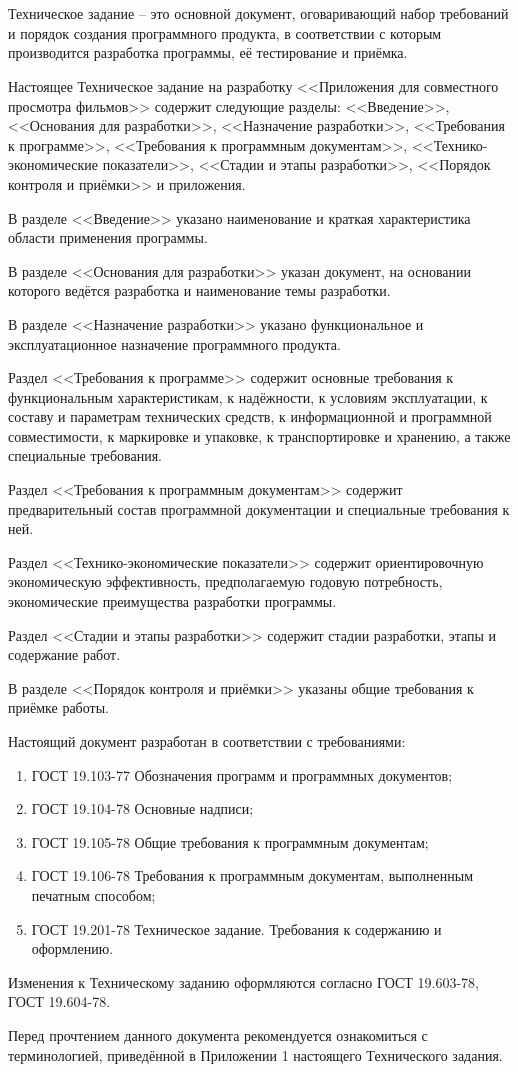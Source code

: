 \section*{}

Техническое задание -- это основной документ, оговаривающий набор требований и порядок создания программного продукта,
в соответствии с которым производится разработка программы, её тестирование и приёмка.

Настоящее Техническое задание на разработку <<Приложения для совместного просмотра фильмов>> содержит следующие разделы:
<<Введение>>, <<Основания для разработки>>, <<Назначение разработки>>, <<Требования к программе>>, <<Требования к программным документам>>,
<<Технико-экономические показатели>>, <<Стадии и этапы разработки>>, <<Порядок контроля и приёмки>> и приложения.

В разделе <<Введение>> указано наименование и краткая характеристика области применения программы.

В разделе <<Основания для разработки>> указан документ, на основании которого ведётся разработка и наименование темы разработки.

В разделе <<Назначение разработки>> указано функциональное и эксплуатационное назначение программного продукта.

Раздел <<Требования к программе>> содержит основные требования к функциональным характеристикам, к надёжности, к условиям
эксплуатации, к составу и параметрам технических средств, к информационной и программной совместимости, к маркировке и
упаковке, к транспортировке и хранению, а также специальные требования.

Раздел <<Требования к программным документам>> содержит предварительный состав программной документации и специальные требования к ней.

Раздел <<Технико-экономические показатели>> содержит ориентировочную экономическую эффективность,
предполагаемую годовую потребность, экономические преимущества разработки программы.

Раздел <<Стадии и этапы разработки>> содержит стадии разработки, этапы и содержание работ.

В разделе <<Порядок контроля и приёмки>> указаны общие требования к приёмке работы.

Настоящий документ разработан в соответствии с требованиями:
\begin{enumerate}
    \item ГОСТ 19.103-77 Обозначения программ и программных документов;
    \item ГОСТ 19.104-78 Основные надписи;
    \item ГОСТ 19.105-78 Общие требования к программным документам;
    \item ГОСТ 19.106-78 Требования к программным документам, выполненным печатным способом;
    \item ГОСТ 19.201-78 Техническое задание.
    Требования к содержанию и оформлению.
\end{enumerate}

Изменения к Техническому заданию оформляются согласно ГОСТ 19.603-78, ГОСТ 19.604-78.

Перед прочтением данного документа рекомендуется ознакомиться с терминологией, приведённой в Приложении 1 настоящего
Технического задания.